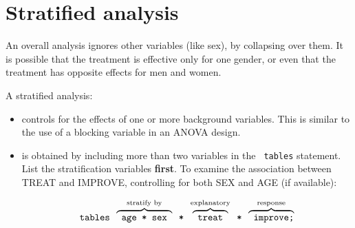 \section{Stratified analysis}\label{sec:twoway-strat}
An overall analysis ignores other variables (like sex), by
collapsing over them.  It is possible that the treatment is effective
only for one gender, or even that the treatment has opposite effects
for men and women.

A stratified analysis:

\begin{itemize}

\item controls for the effects of one or more background variables.
       This is similar to the use of a blocking variable in an ANOVA
       design.

\item is obtained by including more than two variables in the {\tt
       tables} statement.  List the stratification variables {\bf
       first}.  To examine the association between TREAT and IMPROVE,
       controlling for both SEX and AGE (if available):

\begin{equation*}
   \mbox{\texttt{tables }}
   \overbrace{\rule{0in}{1.5ex}\mbox{\texttt{ age * sex }}}^{\mbox{\scriptsize stratify by}}
   \mbox{\texttt{ * }}
   \overbrace{\rule{0in}{1.5ex}\mbox{\texttt{ treat }}}^{\mbox{\scriptsize explanatory}}
   \mbox{\texttt{ * }}
   \overbrace{\rule{0in}{1.5ex}\mbox{\texttt{ improve;}}}^{\mbox{\scriptsize response}}
\end{equation*}

\end{itemize}

